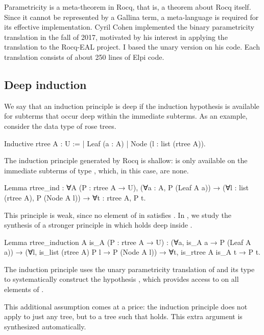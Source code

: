 \documentclass[a4paper, 11pt]{book}
\begin{document}
Parametricity is a meta-theorem in Rocq, that is, a theorem about Rocq itself.
Since it cannot be represented by a Gallina term, a meta-language is required for
its effective implementation. Cyril Cohen implemented the binary parametricity
translation in the fall of 2017, motivated by his interest in applying the
translation to the Rocq-EAL project. I based the unary version on his code. Each
translation consists of about 250 lines of Elpi code.

\subsection{Deep induction}


We say that an induction principle is deep if the induction hypothesis is
available for subterms that occur deep within the immediate subterms. As an
example, consider the data type of rose trees.

\begin{rocqcode}
Inductive rtree A : U :=
| Leaf (a : A)
| Node (l : list (rtree A)).
\end{rocqcode}

The induction principle generated by Rocq is shallow:  is only
available on the immediate subterms of type , which, in this case,
are none.

\begin{rocqcode}
Lemma rtree_ind : ∀A (P : rtree A → U),
  (∀a : A, P (Leaf A a)) →
  (∀l : list (rtree A), P (Node A l)) →
  ∀t : rtree A, P t.
\end{rocqcode}

This principle is weak, since no element of  in 
satisfies . In \cite{tassi:hal-01897468}, we study the synthesis of a
stronger principle in which  holds deep inside .

\begin{rocqcode}
Lemma rtree_induction A is_A (P : rtree A → U) :
  (∀a, is_A a → P (Leaf A a)) →
  (∀l, is_list (rtree A) P l → P (Node A l)) →
     ∀t, is_rtree A is_A t → P t.
\end{rocqcode}


The induction principle uses the unary parametricity translation of 
and its type to systematically construct the hypothesis
, which provides access to  on all
elements of .

This additional assumption comes at a price: the induction principle does not
apply to just any tree, but to a tree  such that
 holds. This extra argument is synthesized
automatically.
\end{document}
